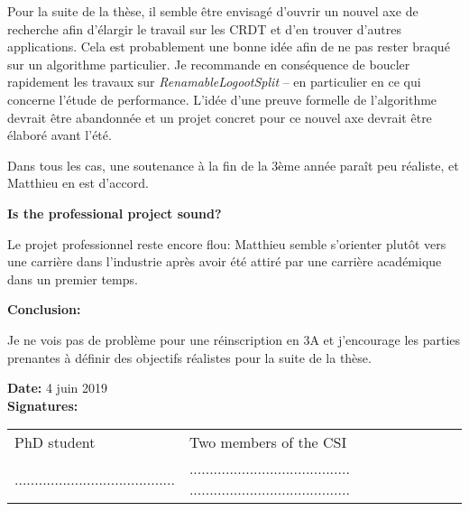 \documentclass[12pt]{article}
\newcommand{\commentaire}[1]{}
\begin{document}
Pour la suite de la thèse, il semble être envisagé d'ouvrir un nouvel axe de
recherche afin d'élargir le travail sur les CRDT et d'en trouver d'autres
applications. Cela est probablement une bonne idée afin de ne pas rester
braqué sur un algorithme particulier. Je recommande en conséquence de boucler
rapidement les travaux sur \emph{RenamableLogootSplit} -- en particulier en ce
qui concerne l'étude de performance. L'idée d'une preuve formelle
de l'algorithme devrait être abandonnée et un projet concret pour ce nouvel axe
devrait être élaboré avant l'été.

Dans tous les cas, une soutenance à la fin de la 3ème année paraît peu réaliste,
et Matthieu en est d'accord.

\medskip
\noindent\textbf{Is the professional project sound?}
\commentaire{%
  E.g.: What is the professional project of the PhD student for after
  the PhD? Is she/he aware of the various options and associated
  expectations (postdoc abroad or in France, industrial R\&D,
  application periods, teaching requirements, etc.)? Have contacts
  been established? Do you have comments about the PhD student’s
  plans for her/his training courses/schools?\\}

Le projet professionnel reste encore flou: Matthieu semble s'orienter plutôt
vers une carrière dans l'industrie après avoir été attiré par une carrière
académique dans un premier temps.

\medskip
\noindent\textbf{Conclusion:}

Je ne vois pas de problème pour une réinscription en 3A et j'encourage les
parties prenantes à définir des objectifs réalistes pour la suite de la thèse.

\bigskip

\noindent\textbf{Date:}
4 juin 2019
\\

\noindent\textbf{Signatures:}

\begin{tabular}{@{}p{5cm}p{12cm}}
  PhD student & Two members of the CSI\\[2ex]
  ........................................
  &
  ........................................
  ........................................
\end{tabular}
\end{document}
